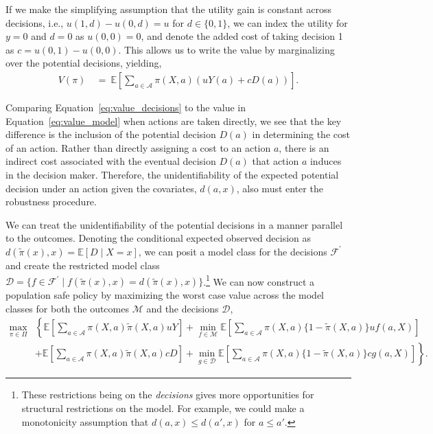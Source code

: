 \documentclass[12pt]{article}
\theoremstyle{definition}
\newcommand{\E}{\ensuremath{\mathbb{E}}}
\newcommand{\<}{\langle}
\renewcommand{\>}{\rangle}
\newcommand\mcal[1]{\ensuremath{\mathcal{#1}}}
\begin{document}
If we make the simplifying assumption that the utility gain is
constant across decisions, i.e., $u(1,d) - u(0,d) = u$ for
$d \in \{0,1\}$, we can index the utility for $y = 0$ and $d= 0 $ as
$u(0,0) = 0$, and denote the added cost of taking decision 1 as
$c = u(0,1) - u(0,0)$.  This allows us to write the value by
marginalizing over the potential decisions, yielding,
\begin{equation}
  \label{eq:value_decisions}
  \begin{aligned}
    V(\pi) &\ = \ \E\left[\sum_{a \in \mcal{A}} \pi(X, a) \left(u Y(a) + cD(a) \right)\right].
  \end{aligned}
\end{equation}
  
Comparing Equation~\eqref{eq:value_decisions} to the value in
Equation~\eqref{eq:value_model} when actions are taken directly, we
see that the key difference is the inclusion of the potential decision
$D(a)$ in determining the cost of an action. Rather than directly
assigning a cost to an action $a$, there is an indirect cost
associated with the eventual decision $D(a)$ that action $a$ induces
in the decision maker. Therefore, the unidentifiability of the
expected potential decision under an action given the covariates,
$d(a,x)$, also must enter the robustness procedure.

We can treat the unidentifiability of the potential decisions in a
manner parallel to the outcomes. Denoting the conditional expected
observed decision as $d(\tilde{\pi}(x), x)=\E[D \mid X = x]$, we can
posit a model class for the decisions $\mcal{F}^\prime$ and create the
restricted model class
$\mcal{D} = \{f \in \mcal{F}^\prime \mid f(\tilde{\pi}(x), x) =
d(\tilde{\pi}(x), x)\}$.\footnote{These restrictions being on the
  \emph{decisions} gives more opportunities for structural
  restrictions on the model. For example, we could make a monotonicity
  assumption that $d(a,x) \leq d(a', x)$ for $a \leq a'$.}  We can now
construct a population safe policy by maximizing the worst case value
across the model classes for both the outcomes $\mcal{M}$ and the
decisions $\mcal{D}$,
\begin{equation}
  \label{eq:maximin_decisions}
  \begin{aligned}
    \max_{\pi \in \Pi}  & \left\{ \E\left[\sum_{a \in \mcal{A}} \pi(X, a)\tilde{\pi}(X, a) u Y \right] + \min_{f \in \mcal{M}} \E\left[\sum_{a \in \mcal{A}} \pi(X, a)\{1 - \tilde{\pi}(X, a)\} uf(a,X)\right] \right. \\
    & \left. + \E\left[\sum_{a \in \mcal{A}} \pi(X, a)\tilde{\pi}(X, a) c D \right] + \min_{g \in \mcal{D}} \E\left[\sum_{a \in \mcal{A}} \pi(X, a)\{1 - \tilde{\pi}(X, a)\} cg(a,X)\right] \right\}.
  \end{aligned}
\end{equation}
\end{document}
